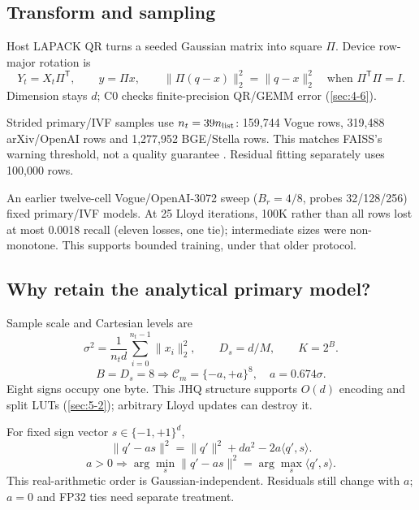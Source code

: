 \subsection{Transform and sampling}

Host LAPACK QR turns a seeded Gaussian matrix into square $\Pi$. Device row-major rotation is
\begin{equation}
 Y_t=X_t\Pi^{\mathsf T},\qquad y=\Pi x,\qquad
 \|\Pi(q-x)\|_2^2=\|q-x\|_2^2
 \quad\text{when }\Pi^{\mathsf T}\Pi=I.
 \label{eq:4-transform}
\end{equation}
Dimension stays $d$; C0 checks finite-precision QR/GEMM error (\cref{sec:4-6}).

Strided primary/IVF samples use $n_t=39n_{\rm list}$: 159,744 Vogue rows, 319,488 arXiv/OpenAI rows and 1,277,952 BGE/Stella rows. This matches FAISS's warning threshold, not a quality guarantee \cite{faiss_clustering}. Residual fitting separately uses 100,000 rows.

An earlier twelve-cell Vogue/OpenAI-3072 sweep ($B_r=4/8$, probes 32/128/256) fixed primary/IVF models. At 25 Lloyd iterations, 100K rather than all rows lost at most 0.0018 recall (eleven losses, one tie); intermediate sizes were non-monotone. This supports bounded training, under that older protocol.

\subsection{Why retain the analytical primary model?}

Sample scale and Cartesian levels are
\begin{equation}
 \sigma^2=\frac{1}{n_t d}\sum_{i=0}^{n_t-1}\|x_i\|_2^2,
 \qquad D_s=d/M,\qquad K=2^B.
 \label{eq:4-scale}
\end{equation}
\[
 B=D_s=8\Longrightarrow
 \mathcal C_m=\{-a,+a\}^{8},\quad a=0.674\sigma.
\]
Eight signs occupy one byte. This JHQ structure supports $O(d)$ encoding and split LUTs \cite{jhq} (\cref{sec:5-2}); arbitrary Lloyd updates can destroy it.

For fixed sign vector $s\in\{-1,+1\}^d$,
\begin{equation}
 \|q'-a s\|^2=\|q'\|^2+da^2-2a\langle q',s\rangle.
 \label{eq:4-sign-ranking}
\end{equation}
\[
 a>0\Longrightarrow
 \arg\min_s\|q'-as\|^2=\arg\max_s\langle q',s\rangle.
\]
This real-arithmetic order is Gaussian-independent. Residuals still change with $a$; $a=0$ and FP32 ties need separate treatment.

